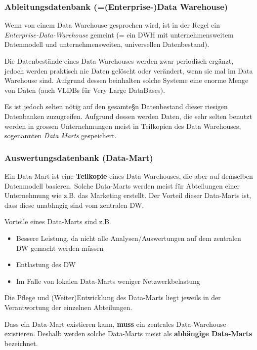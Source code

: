 \documentclass[a4paper, 11pt]{article}
\begin{document}
\subsubsection{Ableitungsdatenbank (=(Enterprise-)Data Warehouse)}
Wenn von einem Data Warehouse gesprochen wird, ist in der Regel ein \textit{Enterprise-Data-Warehouse} gemeint (= ein DWH mit unternehmensweitem Datenmodell und unternehmensweiten, universellen Datenbestand). 

\vspace{10px}

\noindent Die Datenbestände eines Data Warehouses werden zwar periodisch ergänzt, jedoch werden praktisch nie Daten gelöscht oder verändert, wenn sie mal im Data Warehouse sind. Aufgrund dessen beinhalten solche Systeme eine enorme Menge von Daten (auch VLDBs für Very Large DataBases).

Es ist jedoch selten nötig auf den gesamte§n Datenbestand dieser riesigen Datenbanken zuzugreifen. Aufgrund dessen werden Daten, die sehr selten benutzt werden in grossen Unternehmungen meist in Teilkopien des Data Warehouses, sogenannten \textit{Data Marts} gespeichert.

\subsubsection{Auswertungsdatenbank (Data-Mart)}
Ein Data-Mart ist eine \textbf{Teilkopie} eines Data-Warehouses, die aber auf demselben Datenmodell basieren. Solche Data-Marts werden meist für Abteilungen einer Unternehmung wie z.B. das Marketing erstellt. Der Vorteil dieser Data-Marts ist, dass diese unabhngig sind vom zentralen DW.

Vorteile eines Data-Marts sind z.B. 

\begin{itemize}
	\item Bessere Leistung, da nicht alle Analysen/Auswertungen auf dem zentralen DW gemacht werden müssen
	\item Entlastung des DW
	\item Im Falle von lokalen Data-Marts weniger Netzwerkbelastung
\end{itemize}

Die Pflege und (Weiter)Entwicklung des Data-Marts liegt jeweils in der Verantwortung der einzelnen Abteilungen.

\vspace{10px}

\noindent Dass ein Data-Mart existieren kann, \textbf{muss} ein zentrales Data-Warehouse existieren. Deshalb werden solche Data-Marts meist als \textbf{abhängige Data-Marts} bezeichnet.
\end{document}
